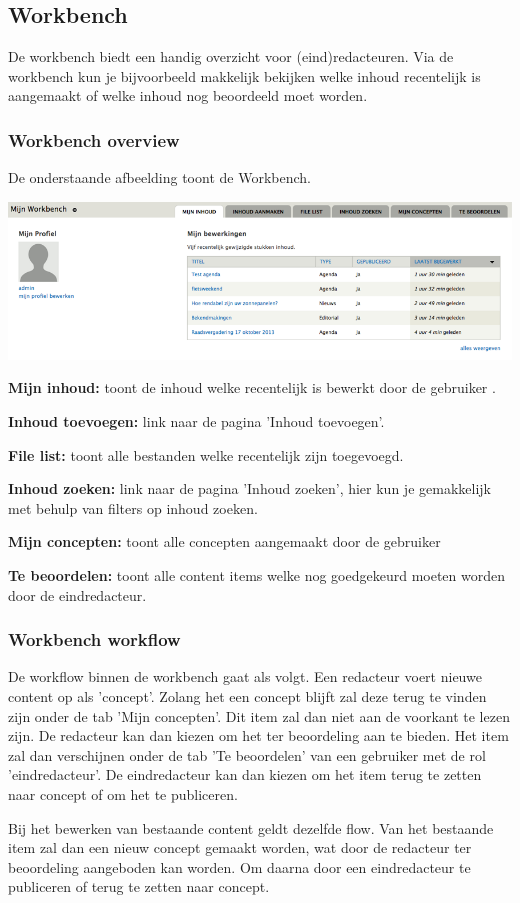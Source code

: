 \subsection{Workbench}\label{workbench}
De workbench biedt een handig overzicht voor (eind)redacteuren. Via de workbench kun je bijvoorbeeld makkelijk bekijken welke inhoud recentelijk is aangemaakt of welke inhoud nog beoordeeld moet worden.

\subsubsection{Workbench overview}\label{workbenchoverview}
De onderstaande afbeelding toont de Workbench. 
\bigskip

\begin{center}
	\includegraphics[width=\textwidth]{img/workbench.png}
\end{center}

\textbf{Mijn inhoud:} toont de inhoud welke recentelijk is bewerkt door de gebruiker .

\textbf{Inhoud toevoegen:} link naar de pagina 'Inhoud toevoegen'.

\textbf{File list:} toont alle bestanden welke recentelijk zijn toegevoegd.

\textbf{Inhoud zoeken:} link naar de pagina 'Inhoud zoeken', hier kun je gemakkelijk met behulp van filters op inhoud zoeken.

\textbf{Mijn concepten:} toont alle concepten aangemaakt door de gebruiker 

\textbf{Te beoordelen:} toont alle content items welke nog goedgekeurd moeten worden door de eindredacteur.

\subsubsection{Workbench workflow}\label{workbenchworkflow}

De workflow binnen de workbench gaat als volgt. Een redacteur voert nieuwe content op als 'concept'. Zolang het een concept blijft zal deze terug te vinden zijn onder de tab 'Mijn concepten'. Dit item zal dan niet aan de voorkant te lezen zijn. De redacteur kan dan kiezen om het ter beoordeling aan te bieden. Het item zal dan verschijnen onder de tab 'Te beoordelen' van een gebruiker met de rol 'eindredacteur'. De eindredacteur kan dan kiezen om het item terug te zetten naar concept of om het te publiceren. 

Bij het bewerken van bestaande content geldt dezelfde flow. Van het bestaande item zal dan een nieuw concept gemaakt worden, wat door de redacteur ter beoordeling aangeboden kan worden. Om daarna door een eindredacteur te publiceren of terug te zetten naar concept.